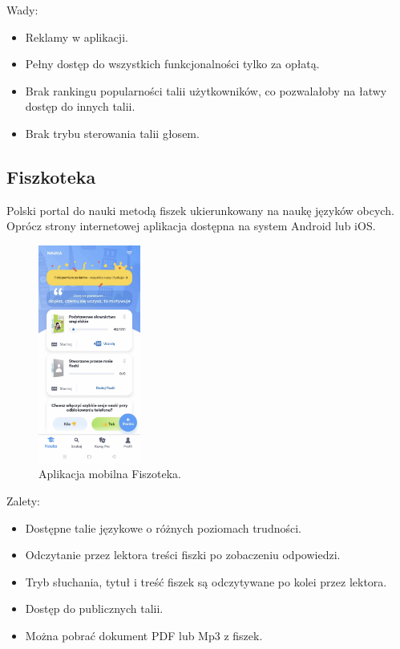 Wady:
\begin{itemize}
    \item Reklamy w aplikacji.
    \item Pełny dostęp do wszystkich funkcjonalności tylko za opłatą.
    \item Brak rankingu popularności talii użytkowników, co pozwalałoby na łatwy dostęp do innych talii.
    \item Brak trybu sterowania talii głosem.
\end{itemize}

\subsection{Fiszkoteka}

Polski portal do nauki metodą fiszek ukierunkowany na naukę języków obcych. Oprócz strony internetowej aplikacja dostępna na system Android lub iOS.

\begin{figure}[H]
    \centering
    \includegraphics[width=0.3\textwidth]{chapters/chapter_3/fiszoteka}
    \caption{Aplikacja mobilna Fiszoteka.}
    \label{img:fiszoteka}
\end{figure}

Zalety:
\begin{itemize}
    \item Dostępne talie językowe o różnych poziomach trudności.
    \item Odczytanie przez lektora treści fiszki po zobaczeniu odpowiedzi.
    \item Tryb słuchania, tytuł i treść fiszek są odczytywane po kolei przez lektora.
    \item Dostęp do publicznych talii.
    \item Można pobrać dokument PDF lub Mp3 z fiszek.
\end{itemize}

